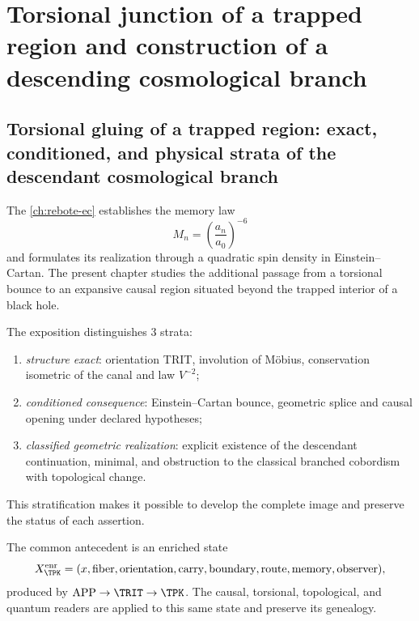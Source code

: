\chapter{Torsional junction of a trapped region and construction of a descending cosmological branch}
\label{chap:universo-descendiente}

\section{Torsional gluing of a trapped region: exact, conditioned, and physical strata of the descendant cosmological branch}

The \cref{ch:rebote-ec} establishes the memory law
\begin{equation}
 M_n=\left(\frac{a_n}{a_0}\right)^{-6}
 \label{eq:descendant-memory-law}
\end{equation}
and formulates its realization through a quadratic spin density in
Einstein--Cartan. The present chapter studies the additional passage from a
torsional bounce to an expansive causal region situated beyond the trapped
interior of a black hole.

The exposition distinguishes \(3\) strata:
\begin{enumerate}
 \item \emph{structure exact}: orientation TRIT, involution of Möbius,
       conservation isometric of the canal and law \(V^{-2}\);
 \item \emph{conditioned consequence}: Einstein--Cartan bounce,
       geometric splice and causal opening under declared hypotheses;
 \item \emph{classified geometric realization}: explicit existence of
       the descendant continuation, minimal, and obstruction to the classical
       branched cobordism with topological change.
\end{enumerate}
This stratification makes it possible to develop the complete image and preserve the
status of each assertion.

The common antecedent is an enriched state
\begin{equation}
 X^{\rm enr}_{\TPK}
 =(x,\text{fiber},\text{orientation},\text{carry},
   \text{boundary},\text{route},\text{memory},\text{observer}),
 \label{eq:descendant-enriched-state}
\end{equation}
produced by \(\mathrm{APP}\to\TRIT\to\TPK\). The causal,
torsional, topological, and quantum readers are applied to this same state and
preserve its genealogy.

